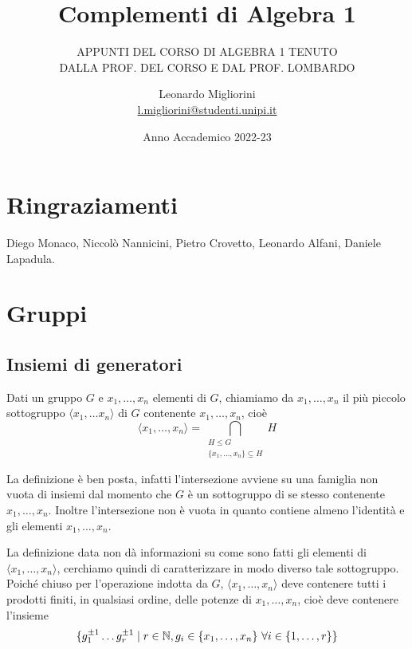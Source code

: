 \documentclass[11pt]{scrartcl}
\begin{document}
\title{Complementi di Algebra 1}
\subtitle{\large\normalfont\rmfamily\scshape APPUNTI DEL CORSO DI ALGEBRA 1 TENUTO\\ DALLA PROF. DEL CORSO E DAL PROF. LOMBARDO}
\author{Leonardo Migliorini \\ \textnormal{\href{l.migliorini@studenti.unipi.it}{l.migliorini@studenti.unipi.it}}}
\date{Anno Accademico 2022-23}
\maketitle
\newpage

\tableofcontents
\eject
\newpage

\section*{Ringraziamenti}

Diego Monaco, Niccolò Nannicini, Pietro Crovetto, Leonardo Alfani, Daniele
Lapadula.

\newpage

\section{Gruppi}

\subsection{Insiemi di generatori}

\begin{definition}
    Dati un gruppo $G$ e $x_1, \ldots, x_n$ elementi di $G$, chiamiamo  da $x_1, \ldots, x_n$ il più piccolo sottogruppo $\langle x_1, \ldots x_n
    \rangle$ di $G$ contenente $x_1, \ldots, x_n$, cioè \[\langle x_1, \ldots, x_n\rangle =
    \bigcap_{\substack{H\leqslant G\\ \{x_1, \ldots, x_n\} \subseteq H}} H\] 
\end{definition}

\begin{remark}
    La definizione è ben posta, infatti l'intersezione avviene su una 
    famiglia non vuota di insiemi dal momento che $G$ è un sottogruppo di 
    se stesso contenente $x_1, \ldots, x_n$. Inoltre l'intersezione non è vuota in 
    quanto contiene almeno l'identità e gli elementi $x_1, \ldots, x_n$.
\end{remark}

La definizione data non dà informazioni su come sono fatti gli elementi di 
$\langle x_1, \ldots, x_n\rangle$, cerchiamo quindi di caratterizzare in modo
diverso tale sottogruppo. Poiché chiuso per l'operazione indotta da $G$, $\langle x_1, \ldots, x_n\rangle$
deve contenere tutti i prodotti finiti, in qualsiasi ordine, delle potenze di
$x_1, \ldots, x_n$, cioè deve contenere l'insieme 
\[\{g_1^{\pm 1} \ldots g_r^{\pm 1}\mid r \in \mathbb N, g_i \in \{x_1, \ldots, x_n\}
~\forall i \in \{1, \ldots, r\}\}\]
\end{document}

